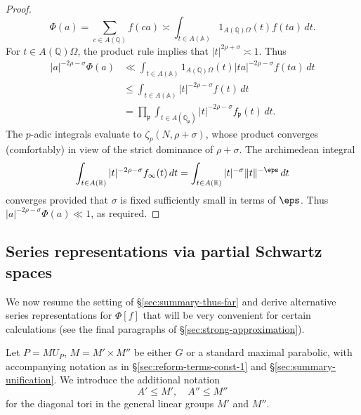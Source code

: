 \begin{proof}
  \begin{equation*}
    \Phi(a) = \sum_{c \in A(\mathbb{Q})} f(c a) \asymp  \int_{t \in A(\mathbb{A})}  1_{A(\mathbb{Q}) \Omega}(t) f(t a) \, d t.
  \end{equation*}
  For $t \in A(\mathbb{Q}) \Omega$, the product rule implies that $|t|^{2 \rho + \sigma} \asymp 1$.  Thus
  \begin{align*}
    |a|^{-2 \rho-\sigma} \Phi(a)
    &\ll \int_{t \in A(\mathbb{A})} 1_{A(\mathbb{Q}) \Omega}(t) |t a|^{-2 \rho - \sigma} f(t a) \, d t \\
    &\leq \int_{t \in A(\mathbb{A})} |t|^{-2 \rho - \sigma} f(t) \, d t \\
    &= \prod_\mathfrak{p} \int_{t \in A(\mathbb{Q}_\mathfrak{p})} |t|^{-2 \rho - \sigma} f_\mathfrak{p}(t) \, d t.
  \end{align*}
  The $p$-adic integrals evaluate to $\zeta_p(N,\rho + \sigma)$, whose product converges (comfortably) in view of the strict dominance of $\rho + \sigma$.  The archimedean integral
  \begin{equation*}
    \int_{t \in A(\mathbb{R})} |t|^{- 2 \rho - \sigma} f_\infty(t) \, d t
    =
    \int_{t \in A(\mathbb{R})} |t|^{- \sigma} \|t\|^{-\eps} \, d t
  \end{equation*}
  converges provided that $\sigma$ is fixed sufficiently small in terms of $\eps$.  Thus $|a|^{- 2 \rho - \sigma} \Phi(a) \ll 1$, as required.
\end{proof}




\subsection{Series representations via partial Schwartz spaces}\label{sec:seri-repr-via}
We now resume the setting of \S\ref{sec:summary-thus-far} and derive alternative series representations for $\Phi[f]$ that will be very convenient for certain calculations (see the final paragraphs of \S\ref{sec:strong-approximation}).

Let $P = M {U_P}$, $M = M' \times M''$ be either $G$ or a standard maximal parabolic, with accompanying notation as in \S\ref{sec:reform-terms-const-1} and \S\ref{sec:summary-unification}.  We introduce the additional notation
\begin{equation*}
  A' \leq M', \quad A'' \leq M''
\end{equation*}
for the diagonal tori in the general linear groups $M'$ and $M''$.

